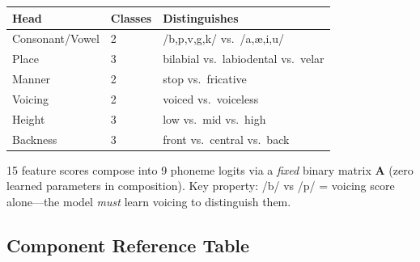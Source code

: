\documentclass[11pt, letterpaper]{article}
\begin{document}
\begin{table}[h]
\centering\small
\begin{tabular}{@{}lll@{}}
\toprule
\textbf{Head} & \textbf{Classes} & \textbf{Distinguishes} \\
\midrule
Consonant/Vowel & 2 & /b,p,v,g,k/ vs.\ /a,\ae,i,u/ \\
Place            & 3 & bilabial vs.\ labiodental vs.\ velar \\
Manner           & 2 & stop vs.\ fricative \\
Voicing          & 2 & voiced vs.\ voiceless \\
Height           & 3 & low vs.\ mid vs.\ high \\
Backness         & 3 & front vs.\ central vs.\ back \\
\bottomrule
\end{tabular}
\end{table}

15 feature scores compose into 9 phoneme logits via a \emph{fixed} binary matrix $\mathbf{A}$ (zero learned parameters in composition). Key property: /b/ vs /p/ = voicing score alone---the model \emph{must} learn voicing to distinguish them.


\subsection{Component Reference Table}
\end{document}
